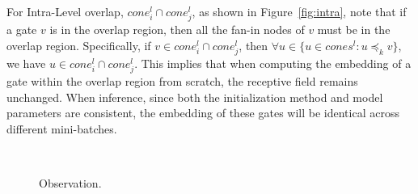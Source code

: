 \begin{minipage}{0.73\textwidth}
    For Intra-Level overlap, \ie $cone^l_i \cap cone^l_j$, as shown in Figure~\ref{fig:intra}, note that if a gate $v$ is in the overlap region, then all the fan-in nodes of $v$ must be in the overlap region. Specifically, if $v \in cone^l_i \cap cone^l_j$, then $\forall u\in\{u\in cones^l: u \preccurlyeq_k v \}$, we have $u \in cone^l_i \cap cone^l_j$. This implies that when computing the embedding of a gate within the overlap region from scratch, the receptive field remains unchanged. When inference, since both the initialization method and model parameters are consistent, the embedding of these gates will be identical across different mini-batches. 
\end{minipage}%
\begin{minipage}{0.25\textwidth}
    \begin{figure}[H]
    \centering
    \\
    \vspace{-10pt}
    \hspace{-5pt}
    \vspace{-10pt}
    \caption{Observation.}
\end{figure}
\end{minipage}


